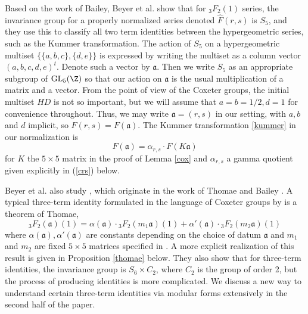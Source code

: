 \documentclass[12pt]{amsart}
\theoremstyle{definition}
\theoremstyle{remark}
\begin{document}
Based on the work of Bailey, Beyer et al. show that for ${}_3F_2(1)$ series, the invariance group for a properly normalized series denoted  $\hat{F}(r,s)$ is $S_5$, and they use this to classify all two term identities between the hypergeometric series, such as the Kummer transformation. The action of $S_5$ on a hypergeometric multiset $\{\{a,b,c\},\{d,e\}\}$ is expressed by writing the multiset as a column vector $(a,b,c,d,e)^t$. Denote such a vector by $\mathfrak{a}$. Then we write $S_5$ as an appropriate subgroup of $\text{GL}_5(\Z)$ so that our action on $\mathfrak{a}$ is the usual multiplication of a matrix and a vector.  From the point of view of the Coxeter groups, the initial multiset $HD$ is not so important, but we will assume that $a=b=1/2,d=1$ for convenience throughout. Thus, we may write $\mathfrak{a}=(r,s)$ in our setting, with $a,b$ and $d$ implicit, so $F(r,s)=F(\mathfrak{a})$. The Kummer transformation \ref{kummer} in our normalization is $$F(\mathfrak{a})=\alpha_{r,s}\cdot F(K\mathfrak{a})$$ for $K$ the $5\times5$ matrix in the proof of Lemma \ref{cox} and $\alpha_{r,s}$ a gamma quotient given explicitly in (\ref{crs}) below. 

Beyer et al. \cite{coxeter} also study , which originate in the work of Thomae \cite{thomae} and Bailey \cite{bailey}. A typical three-term identity formulated in the language of Coxeter groups by \cite{coxeter} is a theorem of Thomae, $${}_3F_2( \mathfrak{a})(1)=\alpha(
\mathfrak{a})\cdot{}_3F_2(m_1\mathfrak{a})(1)+\alpha'(\mathfrak{a})\cdot {}_3F_2(m_2\mathfrak{a})(1)$$  where $\alpha(\mathfrak{a}),\alpha'(\mathfrak{a})$ are constants depending on the choice of datum $\mathfrak{a}$ and $m_1$ and $m_2$ are fixed $5\times5$  matrices specified in \cite{coxeter}. A more explicit realization of this result is given in Proposition \ref{thomae} below. They also show that for three-term identities, the invariance group is $S_6\times C_2$, where $C_2$ is the group of order 2, but the process of producing identities is more complicated. We discuss a new way to understand certain three-term identities via modular forms extensively in the second half of the paper.
\end{document}
